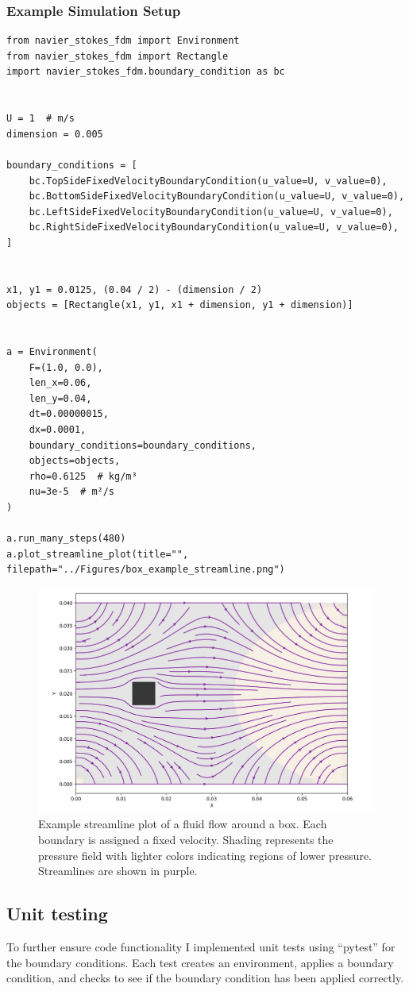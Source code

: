 \subsubsection{Example Simulation Setup}
\begin{verbatim}
from navier_stokes_fdm import Environment
from navier_stokes_fdm import Rectangle
import navier_stokes_fdm.boundary_condition as bc


U = 1  # m/s
dimension = 0.005

boundary_conditions = [
    bc.TopSideFixedVelocityBoundaryCondition(u_value=U, v_value=0),
    bc.BottomSideFixedVelocityBoundaryCondition(u_value=U, v_value=0),
    bc.LeftSideFixedVelocityBoundaryCondition(u_value=U, v_value=0),
    bc.RightSideFixedVelocityBoundaryCondition(u_value=U, v_value=0),
]


x1, y1 = 0.0125, (0.04 / 2) - (dimension / 2)
objects = [Rectangle(x1, y1, x1 + dimension, y1 + dimension)]


a = Environment(
    F=(1.0, 0.0),
    len_x=0.06,
    len_y=0.04,
    dt=0.00000015,
    dx=0.0001,
    boundary_conditions=boundary_conditions,
    objects=objects,
    rho=0.6125  # kg/m³
    nu=3e-5  # m²/s
)

a.run_many_steps(480)
a.plot_streamline_plot(title="", filepath="../Figures/box_example_streamline.png")
\end{verbatim}

\begin{figure}[h]
    \centering
    \includegraphics[width=0.5\linewidth]{Figures/box_example_streamline.png}
    \caption{Example streamline plot of a fluid flow around a box. Each boundary is assigned a fixed velocity. Shading represents the pressure field with lighter colors indicating regions of lower pressure. Streamlines are shown in purple.}
    \label{fig:box_example_streamline}
\end{figure}



\subsection{Unit testing}
To further ensure code functionality I implemented unit tests using ``pytest'' for the boundary conditions.
Each test creates an environment, applies a boundary condition, and checks to see if the boundary condition has been applied correctly.

